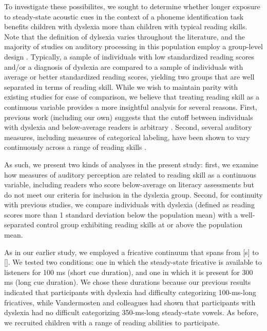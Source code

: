 \documentclass[../uwthesis.tex]{subfiles}
\begin{document}
To investigate these possibilites, we sought to determine whether longer exposure to steady-state acoustic cues in the context of a phoneme identification task benefits children with dyslexia more than children with typical reading skills. Note that the definition of dylsexia varies throughout the literature, and the majority of studies on auditory processing in this population employ a group-level design \cite{Calcus2016IsDyslexia, Law2014TheDyslexia, Ramus2003TheoriesAdults, Talcott2000DynamicSkills}. Typically, a sample of individuals with low standardized reading scores and/or a diagnosis of dyslexia are compared to a sample of individuals with average or better standardized reading scores, yielding two groups that are well separated in terms of reading skill. While we wish to maintain parity with existing studies for ease of comparison, we believe that treating reading skill as a continuous variable provides a more insightful analysis for several reasons. First, previous work (including our own) suggests that the cutoff between individuals with dyslexia and below-average readers is arbitrary \cite{OBrien2018ReadingCategorization, Shaywitz1992EvidenceAbility}. Second, several auditory measures, including measures of categorical labeling, have been shown to vary continuously across a range of reading skills \cite{Goswami2002AmplitudeHypothesis,OBrien2018ReadingCategorization,Vandermosten2010AdultsCues}. 

As such, we present two kinds of analyses in the present study: first, we examine how measures of auditory perception are related to reading skill as a continuous variable, including readers who score below-average on literacy assessments but do not meet our criteria for inclusion in the dyslexia group. Second, for continuity with previous studies, we compare individuals with dyslexia (defined as reading scores more than 1 standard deviation below the population mean) with a well-separated control group exhibiting reading skills at or above the population mean.

As in our earlier study, we employed a fricative continuum that spans from [s] to []. We tested two conditions: one in which the steady-state fricative is available to listeners for 100 ms (short cue duration), and one in which it is present for 300 ms (long cue duration). We chose these durations because our previous results indicated that participants with dyslexia had difficulty categorizing 100-ms-long fricatives, while Vandermosten and colleagues had shown that participants with dyslexia had no difficult categorizing 350-ms-long steady-state vowels. As before, we recruited children with a range of reading abilities to participate.
\end{document}
